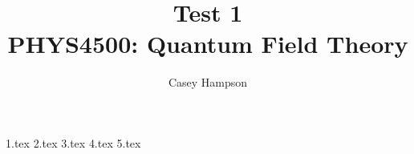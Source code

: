\documentclass[titlepage]{article}
\title{Test 1 \\[5pt] PHYS4500: Quantum Field Theory}
\author{Casey Hampson}
\begin{document}
    \maketitle
    \pagebreak

    {1.tex}
    {2.tex}
    {3.tex}
    {4.tex}
    {5.tex}
\end{document}
